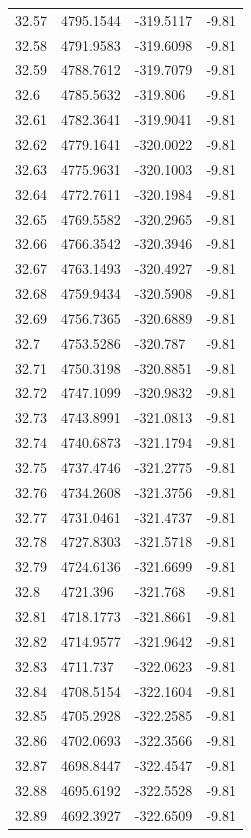 \begin{table}[H]
\begin{tabular}{llll}
32.57 & 4795.1544 & -319.5117 & -9.81 \\
32.58 & 4791.9583 & -319.6098 & -9.81 \\
32.59 & 4788.7612 & -319.7079 & -9.81 \\
32.6 & 4785.5632 & -319.806 & -9.81 \\
32.61 & 4782.3641 & -319.9041 & -9.81 \\
32.62 & 4779.1641 & -320.0022 & -9.81 \\
32.63 & 4775.9631 & -320.1003 & -9.81 \\
32.64 & 4772.7611 & -320.1984 & -9.81 \\
32.65 & 4769.5582 & -320.2965 & -9.81 \\
32.66 & 4766.3542 & -320.3946 & -9.81 \\
32.67 & 4763.1493 & -320.4927 & -9.81 \\
32.68 & 4759.9434 & -320.5908 & -9.81 \\
32.69 & 4756.7365 & -320.6889 & -9.81 \\
32.7 & 4753.5286 & -320.787 & -9.81 \\
32.71 & 4750.3198 & -320.8851 & -9.81 \\
32.72 & 4747.1099 & -320.9832 & -9.81 \\
32.73 & 4743.8991 & -321.0813 & -9.81 \\
32.74 & 4740.6873 & -321.1794 & -9.81 \\
32.75 & 4737.4746 & -321.2775 & -9.81 \\
32.76 & 4734.2608 & -321.3756 & -9.81 \\
32.77 & 4731.0461 & -321.4737 & -9.81 \\
32.78 & 4727.8303 & -321.5718 & -9.81 \\
32.79 & 4724.6136 & -321.6699 & -9.81 \\
32.8 & 4721.396 & -321.768 & -9.81 \\
32.81 & 4718.1773 & -321.8661 & -9.81 \\
32.82 & 4714.9577 & -321.9642 & -9.81 \\
32.83 & 4711.737 & -322.0623 & -9.81 \\
32.84 & 4708.5154 & -322.1604 & -9.81 \\
32.85 & 4705.2928 & -322.2585 & -9.81 \\
32.86 & 4702.0693 & -322.3566 & -9.81 \\
32.87 & 4698.8447 & -322.4547 & -9.81 \\
32.88 & 4695.6192 & -322.5528 & -9.81 \\
32.89 & 4692.3927 & -322.6509 & -9.81 \\

\end{tabular}
\end{table}
